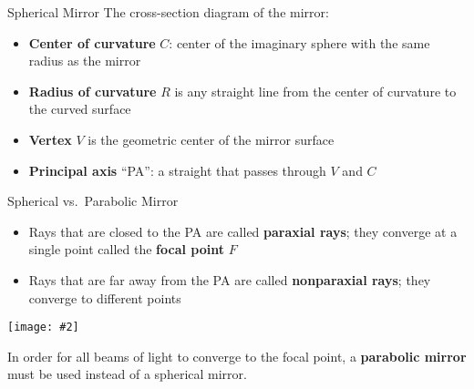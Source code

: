 \documentclass[12pt,compress,aspectratio=169]{beamer}
\newcommand{\pic}[2]{\texttt{[image: \#2]}}
\begin{document}
\begin{frame}{Spherical Mirror}
  The cross-section diagram of the mirror:
  \begin{center}
  \end{center}
  \begin{itemize}
  \item\textbf{Center of curvature} $C$: center of the imaginary sphere
    with the same radius as the mirror
  \item\textbf{Radius of curvature} $R$ is any straight line from the
    center of curvature to the curved surface
  \item\textbf{Vertex} $V$ is the geometric center of the mirror surface
  \item\textbf{Principal axis} ``PA'': a straight that passes through $V$ and
    $C$
  \end{itemize}
\end{frame}


\begin{frame}{Spherical vs.\ Parabolic Mirror}
  \begin{itemize}
  \item Rays that are closed to the PA are called \textbf{paraxial rays}; they
    converge at a single point called the \textbf{focal point} $F$
  \item Rays that are far away from the PA are called \textbf{nonparaxial rays};
    they converge to different points
  \end{itemize}
  \begin{center}
    \pic{.6}{graphics/spherical-vs-parabolic.png}
  \end{center}
  In order for all beams of light to converge to the focal point, a
  \textbf{parabolic mirror} must be used instead of a spherical mirror.
\end{frame}
\end{document}
